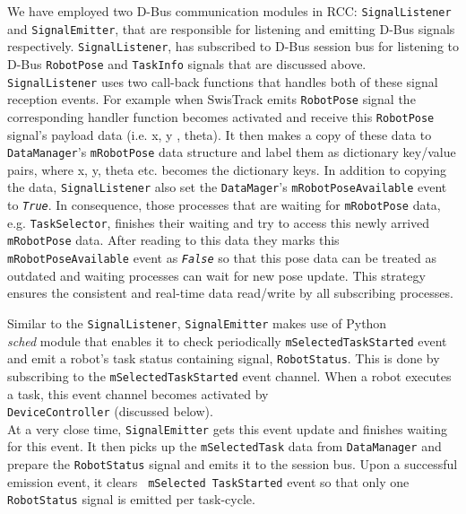 \documentclass[final,5p,times,twocolumn]{elsarticle}
\begin{document}
We have employed two D-Bus communication modules in RCC: \texttt{SignalListener} and \texttt{SignalEmitter}, that are responsible for listening and emitting D-Bus signals respectively. \texttt{SignalListener}, has subscribed to D-Bus session bus for listening  to D-Bus \texttt{RobotPose} and \texttt{TaskInfo} signals that are discussed above. \texttt{SignalListener} uses two call-back functions that handles both of these signal reception events. For example when SwisTrack emits \texttt{RobotPose} signal  the corresponding handler function becomes activated and receive this \texttt{RobotPose} signal's payload data (i.e. x, y , theta). It then makes a copy of these data  to \texttt{DataManager}'s \texttt{mRobotPose} data structure and label them as dictionary key/value pairs, where x, y, theta etc. becomes the dictionary keys. In addition to copying the data, \texttt{SignalListener} also set the \texttt{DataMager}'s   \texttt{mRobotPoseAvailable} event to {\em \texttt{True}}. In consequence, those processes that are waiting for \texttt{mRobotPose} data, e.g. \texttt{TaskSelector}, finishes their waiting and try to access this newly arrived \texttt{mRobotPose} data. After reading to this data they marks this \texttt{mRobotPoseAvailable} event as  {\em \texttt{False}} so that this pose data can be treated as outdated and waiting processes can wait for new pose update. This strategy ensures the consistent and real-time data read/write by all subscribing processes.

Similar to the \texttt{SignalListener}, \texttt{SignalEmitter} makes use of Python\\ {\em sched} module that enables it to check periodically \texttt{mSelectedTaskStarted} event and emit a robot's task status containing signal, \texttt{RobotStatus}.  This is done by subscribing to the  \texttt{mSelectedTaskStarted} event channel. When a robot executes a task, this event channel becomes  activated by\\ \texttt{DeviceController} (discussed below).\\ At a very close time, \texttt{SignalEmitter} gets this event update and finishes waiting for this event. It then picks up the \texttt{mSelectedTask} data from \texttt{DataManager} and prepare the \texttt{RobotStatus} signal and emits it to the session bus. Upon a successful emission event, it clears \texttt{ mSelected TaskStarted} event so that only one \texttt{RobotStatus}  signal is emitted per task-cycle.
\end{document}
